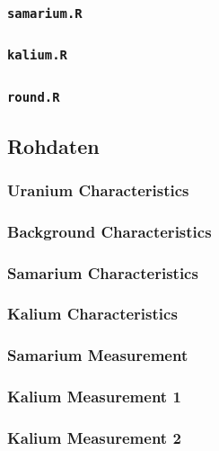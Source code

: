 \documentclass[12pt]{article}
\newcommand{\code}[1]{\texttt{#1}}
\begin{document}
\subsubsection{\code{samarium.R}}\label{samarium.R}

\subsubsection{\code{kalium.R}}\label{kalium.R}

\subsubsection{\code{round.R}}\label{round.R}


\subsection{Rohdaten}
\subsubsection{Uranium Characteristics}

\subsubsection{Background Characteristics}

\subsubsection{Samarium Characteristics}

\subsubsection{Kalium Characteristics}

\subsubsection{Samarium Measurement}

\subsubsection{Kalium Measurement 1}

\subsubsection{Kalium Measurement 2}

\end{document}
